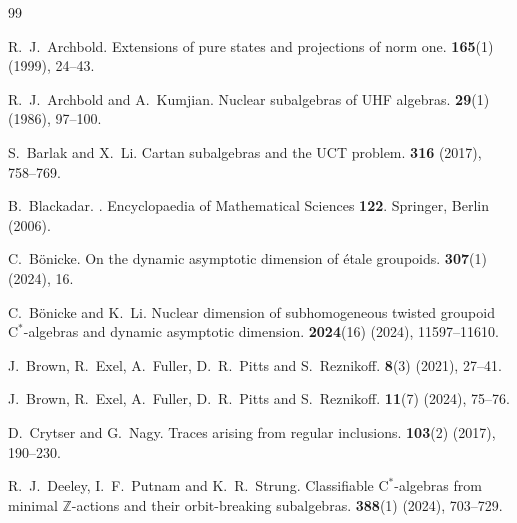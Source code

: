 \documentclass[11pt,a4paper]{amsart}
\theoremstyle{definition}
\numberwithin{equation}{section}
\begin{document}
\begin{thebibliography}{99}

R.\ J.\ Archbold.
\newblock Extensions of pure states and projections of norm one.
 {\bf 165}(1) (1999), 24--43.

R.\ J.\ Archbold and A.\ Kumjian.
\newblock Nuclear subalgebras of UHF algebras.
 {\bf 29}(1) (1986), 97--100.

S.\ Barlak and X.\ Li.
\newblock Cartan subalgebras and the UCT problem.
 {\bf 316} (2017), 758--769.

B.\ Blackadar.
.
\newblock Encyclopaedia of Mathematical Sciences {\bf 122}. Springer, Berlin (2006).


C.\ B{\"o}nicke. 
\newblock On the dynamic asymptotic dimension of {\'e}tale groupoids.
 {\bf 307}(1) (2024), 16.

C.\ B{\"o}nicke and K.\ Li.
\newblock Nuclear dimension of subhomogeneous twisted groupoid $\mathrm{C}^\ast$-algebras and dynamic asymptotic dimension.
 {\bf 2024}(16) (2024), 11597--11610.


J.\ Brown, R.\ Exel, A.\ Fuller, D.\ R.\ Pitts and S.\ Reznikoff.
 {\bf 8}(3) (2021), 27--41.

J.\ Brown, R.\ Exel, A.\ Fuller, D.\ R.\ Pitts and S.\ Reznikoff.
 {\bf 11}(7) (2024), 75--76.


D.\ Crytser and G.\ Nagy.
\newblock Traces arising from regular inclusions.
 {\bf 103}(2) (2017), 190--230.

R.\ J.\ Deeley, I.\ F.\ Putnam and K.\ R.\ Strung.
\newblock Classifiable $\mathrm{C}^\ast$-algebras from minimal $\mathbb{Z}$-actions and their orbit-breaking subalgebras.
 {\bf 388}(1) (2024), 703--729.


\end{thebibliography}
\end{document}
